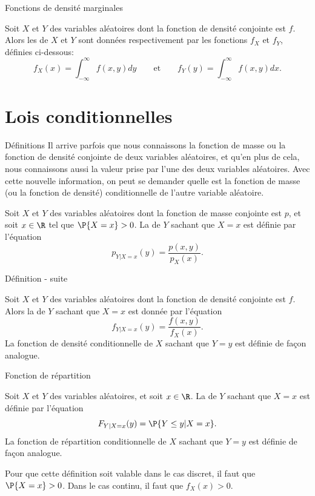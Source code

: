 \documentclass[nuit,charter,pied]{BeamerJS}
\begin{document}
\begin{frame}[t]{Fonctions de densité marginales}
	\pause
	\begin{defn}{}
		Soit $X$ et $Y$ des variables aléatoires dont la fonction de densité conjointe est $f$. Alors les  de $X$ et $Y$ sont données respectivement par les fonctions $f_X$ et $f_Y$, définies ci-dessous:
		\[f_X(x)=\int_{-\infty}^{\infty} f(x,y)dy\qquad\text{et}\qquad f_Y(y)=\int_{-\infty}^{\infty} f(x,y)dx.\]
	\end{defn}
\end{frame}
\section[Lois cond.]{Lois conditionnelles}
\begin{frame}[t]{Définitions}
	Il arrive parfois que nous connaissons la fonction de masse ou la fonction de densité conjointe de deux variables aléatoires, et qu'en plus de cela, nous connaissons aussi la valeur prise par l'une des deux variables aléatoires. Avec cette nouvelle information, on peut se demander quelle est la fonction de masse (ou la fonction de densité) conditionnelle de l'autre variable aléatoire.
	\begin{defn}{}
		Soit $X$ et $Y$ des variables aléatoires dont la fonction de masse conjointe est $p$, et soit $x\in\R$ tel que $\P{X=x}>0$. La  de $Y$ sachant que $X=x$ est définie par l'équation
		\[p_{Y|X=x}(y)=\frac{p(x,y)}{p_X(x)}.\]
	\end{defn}
\end{frame}
\begin{frame}[t]{Définition - suite}
	\begin{defn}{}
		Soit $X$ et $Y$ des variables aléatoires dont la fonction de densité conjointe est $f$. Alors la  de $Y$ sachant que $X=x$ est donnée par l'équation
		\[f_{Y|X=x}(y)=\frac{f(x,y)}{f_X(x)}.\]
		La fonction de densité conditionnelle de $X$ sachant que $Y=y$ est définie de façon analogue.
	\end{defn}
\end{frame}
\begin{frame}[t]{Fonction de répartition}
	\begin{defn}{}
		Soit $X$ et $Y$ des variables aléatoires, et soit $x\in\R$. La  de $Y$ sachant que $X=x$ est définie par l'équation
		\[F_{Y|X=x}(y)=\P{Y\leq y|X=x}.\]
		La fonction de répartition conditionnelle de $X$ sachant que $Y=y$ est définie de façon analogue.
	\end{defn}
	Pour que cette définition soit valable dans le cas discret, il faut que $\P{X=x}>0$. Dans le cas continu, il faut que $f_X(x)>0$.
\end{frame}
\end{document}
